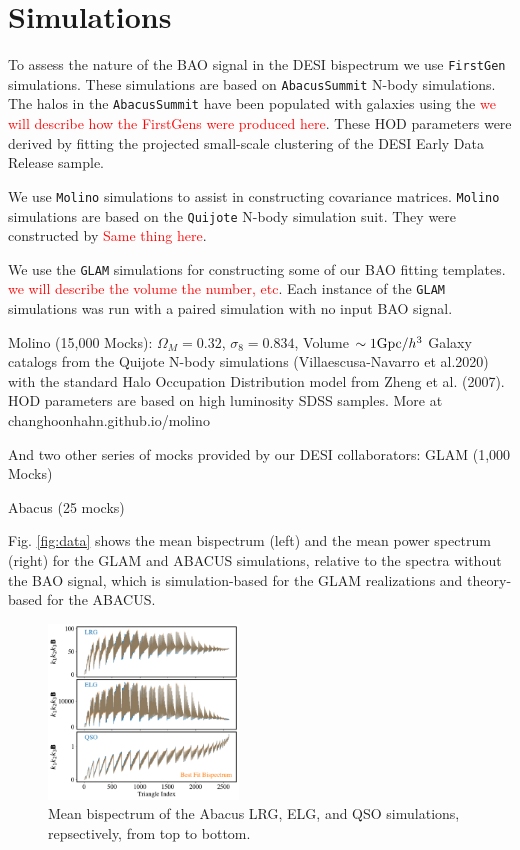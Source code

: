 \section{Simulations}
\label{sec:simulations}

To assess the nature of the BAO signal in the DESI bispectrum we use \texttt{FirstGen} simulations. These simulations are based on \texttt{AbacusSummit} N-body simulations. The halos in the \texttt{AbacusSummit} have been populated with galaxies using the \textcolor{red}{we will describe how the FirstGens were produced here}. These HOD parameters were derived by fitting the projected small-scale clustering of the DESI Early Data Release sample. 

We use \texttt{Molino} simulations to assist in constructing covariance matrices. \texttt{Molino} simulations are based on the \texttt{Quijote} N-body simulation suit. They were constructed by \textcolor{red}{Same thing here}.

We use the \texttt{GLAM} simulations for constructing some of our BAO fitting templates. \textcolor{red}{we will describe the volume the number, etc}. Each instance of the \texttt{GLAM} simulations was run with a paired simulation with no input BAO signal. 

Molino (15,000 Mocks): 
$\Omega_{M}=0.32$, $\sigma_{8}=0.834$, Volume $\sim 1 {\rm Gpc}/h^{3}$ 
Galaxy catalogs from the Quijote N-body simulations (Villaescusa-Navarro et al.2020) with the standard Halo Occupation Distribution model from Zheng et al. (2007). HOD parameters are based on high luminosity SDSS samples. More at changhoonhahn.github.io/molino

And two other series of mocks provided by our DESI collaborators:
GLAM (1,000 Mocks)

Abacus (25 mocks)


Fig. \ref{fig:data} shows the mean bispectrum (left) and the mean power spectrum (right) for the GLAM and ABACUS simulations, relative to the spectra without the BAO signal, which is simulation-based for the GLAM realizations and theory-based for the ABACUS.

\begin{figure}
\includegraphics[width=0.45\textwidth]{figures/spectra.pdf}
\caption{Mean bispectrum of the Abacus LRG, ELG, and QSO simulations, repsectively, from top to bottom.}\label{fig:spectra}
\end{figure}


